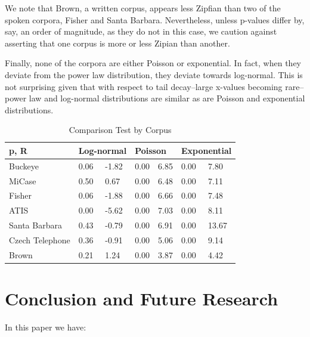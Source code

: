 \documentclass[12pt]{article}
\begin{document}
We note that Brown, a written corpus, appears less Zipfian than two of the spoken corpora, Fisher and Santa Barbara. Nevertheless, unless p-values differ by, say, an order of magnitude, as they do not in this case, we caution against asserting that one corpus is more or less Zipian than another.  

Finally, none of the corpora are either Poisson or exponential. In fact, when they deviate from the power law distribution, they deviate towards log-normal.  This is not surprising given that with respect to tail decay--large x-values becoming rare--power law and log-normal distributions are similar as are Poisson and exponential distributions.  
\begin{table}[H]
\caption{Comparison Test by Corpus}
\begin{center}

\begin{tabular}{| *{7}{l|} }
    \hline
p, R& \multicolumn{2}{l|}{Log-normal}
            & \multicolumn{2}{l|}{Poisson}
                    & \multicolumn{2}{l|}{Exponential}\\
    \hline
Buckeye  & 0.06 & -1.82 & 0.00 & 6.85 & 0.00 & 7.80 \\
    \hline
MiCase & 0.50 & 0.67 & 0.00 & 6.48 & 0.00 & 7.11  \\
    \hline
Fisher   & 0.06 & -1.88 & 0.00 & 6.66 & 0.00 & 7.48\\
    \hline
ATIS   & 0.00 & -5.62 & 0.00 & 7.03 & 0.00 & 8.11\\
    \hline
Santa Barbara  & 0.43 & -0.79 & 0.00 & 6.91 & 0.00 & 13.67  \\
    \hline
Czech Telephone & 0.36 & -0.91 & 0.00 & 5.06 & 0.00 & 9.14   \\
    \hline
Brown & 0.21 & 1.24 & 0.00 & 3.87 & 0.00 & 4.42 \\
    \hline
\end{tabular}
\end{center}
\end{table}

\section{Conclusion and Future Research}

In this paper we have:  
\end{document}

